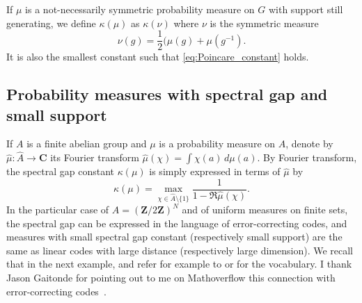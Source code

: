 \documentclass[10pt]{amsart}
\theoremstyle{plain}
\theoremstyle{definition}
\newcommand{\C}{\mathbf{C}}
\newcommand{\Z}{\mathbf{Z}}
\begin{document}
If $\mu$ is a not-necessarily symmetric probability measure on $G$ with support still generating, we define $\kappa(\mu)$ as $\kappa(\nu)$ where $\nu$ is the symmetric measure\vspace*{-3pt}
\[
\nu(g) = \frac{1}{2}(\mu(g)+\mu(g^{-1}).
\]
It is also the smallest constant such that \eqref{eq:Poincare_constant} holds.


\subsection{Probability measures with spectral gap and small support}
If $A$ is a finite abelian group and $\mu$ is a probability measure on $A$, denote by $\hat \mu:\hat A \to \C$ its Fourier transform $\hat \mu(\chi) = \int \chi(a) \,d\mu(a)$. By Fourier transform, the spectral gap constant $\kappa(\mu)$ is simply expressed in terms of $\hat \mu$ by\vspace*{-3pt}
\begin{equation}\label{eq:spectral_gap_abelian}\kappa(\mu) = \max_{\chi \in \hat A \setminus \{1\}} \frac{1}{1-\Re\hat \mu(\chi)}.
\end{equation}
In the particular case of $A=(\Z/2\Z)^N$ and of uniform measures on finite sets, the spectral gap can be expressed in the language of error-correcting codes, and measures with small spectral gap constant (respectively small support) are the same as linear codes with large distance (respectively large dimension). We recall that in the next example, and refer for example to \cite{MR0465509} or \cite{MR1996953} for the vocabulary. I thank Jason Gaitonde for pointing out to me on Mathoverflow this connection with error-correcting codes~\cite{414657}.
\end{document}
